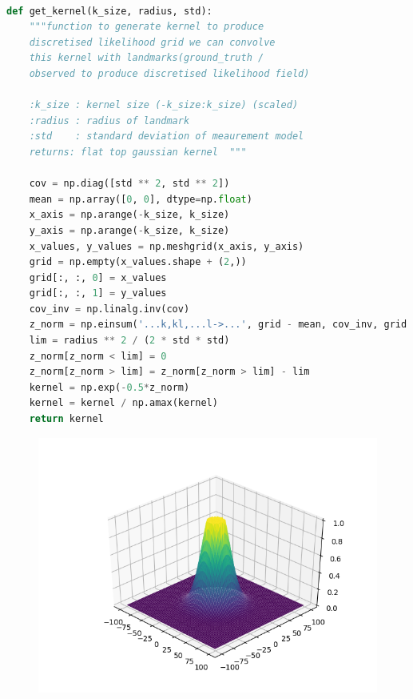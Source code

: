 \documentclass{article}
\begin{document}
\begin{lstlisting}[language=Python]

def get_kernel(k_size, radius, std):
    """function to generate kernel to produce
    discretised likelihood grid we can convolve
    this kernel with landmarks(ground_truth /
    observed to produce discretised likelihood field)

    :k_size : kernel size (-k_size:k_size) (scaled)
    :radius : radius of landmark
    :std    : standard deviation of meaurement model
    returns: flat top gaussian kernel  """

    cov = np.diag([std ** 2, std ** 2])
    mean = np.array([0, 0], dtype=np.float)
    x_axis = np.arange(-k_size, k_size)
    y_axis = np.arange(-k_size, k_size)
    x_values, y_values = np.meshgrid(x_axis, y_axis)
    grid = np.empty(x_values.shape + (2,))
    grid[:, :, 0] = x_values
    grid[:, :, 1] = y_values
    cov_inv = np.linalg.inv(cov)
    z_norm = np.einsum('...k,kl,...l->...', grid - mean, cov_inv, grid - mean)
    lim = radius ** 2 / (2 * std * std)
    z_norm[z_norm < lim] = 0
    z_norm[z_norm > lim] = z_norm[z_norm > lim] - lim
    kernel = np.exp(-0.5*z_norm)
    kernel = kernel / np.amax(kernel)
    return kernel


\end{lstlisting}
\begin{figure}


     \centering
        \includegraphics[width = \linewidth]{kernel.png}
    \end{figure}   
\end{document}
